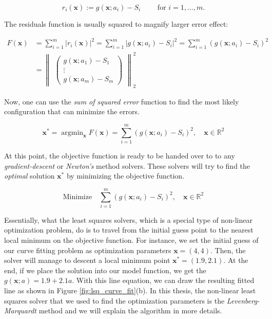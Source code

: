 \documentclass[a4paper]{report}
\numberwithin{figure}{section}
\newcommand{\argmin}{\mathop{\mathrm{argmin}}}
\newcommand{\R}{\mathbb{R}}
\begin{document}
\begin{appendices}
\begin{equation}
  r_i(\mathbf{x}) := g(\mathbf{x};a_i) - S_i \qquad \text{ for }  i = 1,\dots,m.
\label{eq:}
\end{equation}

The residuals function is usually squared to magnify larger error effect:

\begin{equation}
\begin{aligned}
  F(\mathbf{x}) & = \sum_{i=1}^{m} \vert r_i(\mathbf{x}) \vert^2 = 
  \sum_{i=1}^{m} \vert g(\mathbf{x};a_i) - S_i \vert^2 =
  \sum_{i=1}^{m} (g(\mathbf{x};a_i) - S_i)^2 \\
& = \begin{Vmatrix}
  \begin{pmatrix} g(\mathbf{x};a_1) - S_1 \\ \vdots \\ g(\mathbf{x};a_m) - S_m \end{pmatrix} 
\end{Vmatrix}_2^2
\label{eq}
\end{aligned}
\end{equation}

Now, one can use the \textit{sum of squared error} function to find the most likely
configuration that can minimize the errors. 

\begin{equation}
  \mathbf{x}^* = \argmin_{\mathbf{x}} F(\mathbf{x}) = 
  \sum_{i=1}^{m} (g(\mathbf{x};a_i) - S_i)^2, 
  \quad \mathbf{x} \in \R^2
\label{eq}
\end{equation}

At this point, the objective function is ready to be handed over to 
to any \textit{gradient-descent} or 
\textit{Newton's} method solvers.
These solvers will try to find the
\textit{optimal} solution $\mathbf{x}^*$ by minimizing the objective function.

\begin{equation}
  \text{Minimize} \quad \sum_{i=1}^{m} (g(\mathbf{x};a_i) - S_i)^2, 
\quad \mathbf{x} \in \R^2
\label{eq}
\end{equation}

Essentially, what the least squares solvers, which is a special type of 
non-linear optimization problem, 
do is to travel from the initial guess point to the nearest local minimum 
on the objective function. 
For instance, we set  
the initial guess of our curve fitting problem 
as optimization parameters $\mathbf{x}=(4,4)$. 
Then, the solver will 
manage to descent a local minimum point 
$\mathbf{\mathbf{x^*}}=(1.9,2.1)$. 
At the end, if we place the solution into our model function, we
get the $g(\mathbf{x};a)=1.9+2.1a$. With this line equation, we can draw the resulting fitted line 
as shown in Figure \ref{fig:lsq_curve_fit}(b).
In this thesis, the non-linear least squares solver that we used to find the 
optimization 
parameters is the \textit{Levenberg-Marquardt} method and we will explain 
the algorithm in more details.


\end{appendices}
\end{document}
